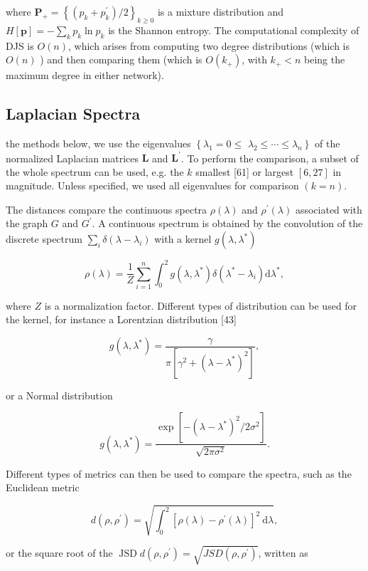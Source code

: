 where $\mathbf{P}_{+}=\left\{\left(p_{k}+p_{k}^{\prime}\right) / 2\right\}_{k \geq 0}$ is a mixture distribution and $H[\mathbf{p}]=-\sum_{k} p_{k} \ln p_{k}$ is the Shannon entropy. The computational complexity of DJS is $O(n)$, which arises from computing two degree distributions (which is $O(n)$ ) and then comparing them (which is $O\left(k_{+}\right)$, with $k_{+}<n$ being the maximum degree in either network).

\subsection{Laplacian Spectra}
the methods below, we use the eigenvalues $\left\{\lambda_{1}=0 \leq\right.$ $\left.\lambda_{2} \leq \cdots \leq \lambda_{n}\right\}$ of the normalized Laplacian matrices $\mathbf{L}$ and $\mathbf{L}^{\prime}$. To perform the comparison, a subset of the whole spectrum can be used, e.g. the $k$ smallest [61] or largest $[6,27]$ in magnitude. Unless specified, we used all eigenvalues for comparison $(k=n)$.

The distances compare the continuous spectra $\rho(\lambda)$ and $\rho^{\prime}(\lambda)$ associated with the graph $G$ and $G^{\prime}$. A continuous spectrum is obtained by the convolution of the discrete spectrum $\sum_{i} \delta\left(\lambda-\lambda_{i}\right)$ with a kernel $g\left(\lambda, \lambda^{*}\right)$

$$
\rho(\lambda)=\frac{1}{Z} \sum_{i=1}^{n} \int_{0}^{2} g\left(\lambda, \lambda^{*}\right) \delta\left(\lambda^{*}-\lambda_{i}\right) \mathrm{d} \lambda^{*},
$$

where $Z$ is a normalization factor. Different types of distribution can be used for the kernel, for instance a Lorentzian distribution [43]

$$
g\left(\lambda, \lambda^{*}\right)=\frac{\gamma}{\pi\left[\gamma^{2}+\left(\lambda-\lambda^{*}\right)^{2}\right]},
$$

or a Normal distribution

$$
g\left(\lambda, \lambda^{*}\right)=\frac{\exp \left[-\left(\lambda-\lambda^{*}\right)^{2} / 2 \sigma^{2}\right]}{\sqrt{2 \pi \sigma^{2}}} .
$$

Different types of metrics can then be used to compare the spectra, such as the Euclidean metric

$$
d\left(\rho, \rho^{\prime}\right)=\sqrt{\int_{0}^{2}\left[\rho(\lambda)-\rho^{\prime}(\lambda)\right]^{2} \mathrm{~d} \lambda},
$$

or the square root of the $\operatorname{JSD} d\left(\rho, \rho^{\prime}\right)=\sqrt{J S D\left(\rho, \rho^{\prime}\right)}$, written as

